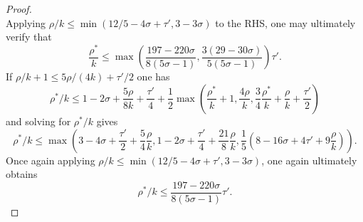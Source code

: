 \begin{proof}
\[\]
Applying $\rho/k \le \min(12/5 - 4\sigma + \tau', 3 - 3\sigma)$ to the RHS, one may ultimately verify that
\[
\frac{\rho^*}{k} \le \max\left(\frac{197 - 220\sigma}{8(5\sigma - 1)}, \frac{3(29 - 30\sigma)}{5(5\sigma - 1)}\right)\tau'.
\]
If $\rho/k + 1 \le 5\rho/(4k) + \tau'/2$ one has
\[
\rho^*/k \leq 1-2\sigma + \frac{5\rho}{8k} + \frac{\tau'}{4} + \frac{1}{2}\max(\frac{\rho^*}{k}+1, \frac{4\rho}{k}, \frac{3}{4}\frac{\rho^*}{k} + \frac{\rho}{k}+\frac{\tau'}{2})
\]
and solving for $\rho^*/k$ gives
\[
\rho^*/k \le \max(3 - 4\sigma + \frac{\tau'}{2} + \frac{5}{4}\frac{\rho}{k}, 1 - 2\sigma + \frac{\tau'}{4} + \frac{21}{8}\frac{\rho}{k}, \frac{1}{5}(8 - 16\sigma + 4\tau' + 9\frac{\rho}{k})).
\]
Once again applying $\rho/k \le \min(12/5 - 4\sigma + \tau', 3 - 3\sigma)$, one again ultimately obtains
\[
\rho^*/k \le \frac{197 - 220\sigma}{8(5\sigma - 1)}\tau'.
\]


\end{proof}
